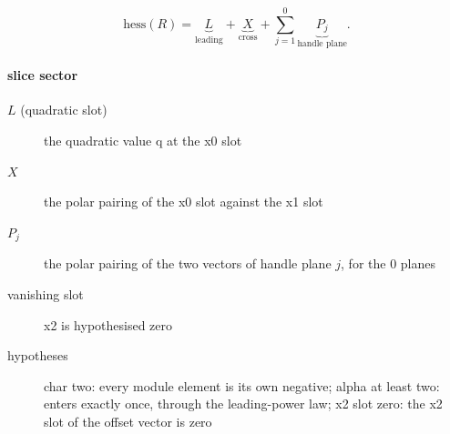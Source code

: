 \[\mathrm{hess}(R)=\underbrace{L}_{\text{leading}}+\underbrace{X}_{\text{cross}}+\sum_{j=1}^{0}\underbrace{P_j}_{\text{handle plane}}.\]
\paragraph{slice sector}
\begin{description}
\item[$L$ (quadratic slot)] the quadratic value q at the x0 slot
\item[$X$] the polar pairing of the x0 slot against the x1 slot
\item[$P_j$] the polar pairing of the two vectors of handle plane $j$, for the 0 planes
\item[vanishing slot] x2 is hypothesised zero
\item[hypotheses] char two: every module element is its own negative; alpha at least two: enters exactly once, through the leading-power law; x2 slot zero: the x2 slot of the offset vector is zero
\end{description}
